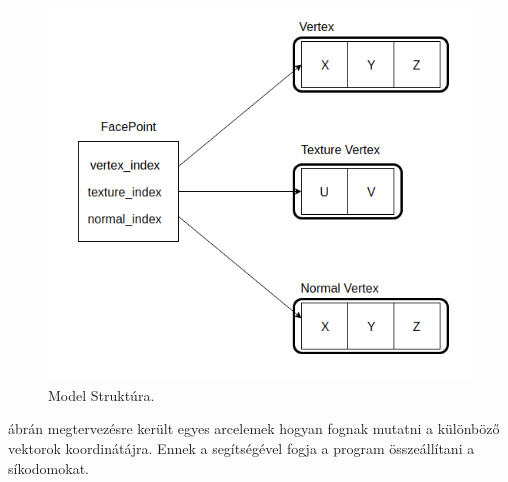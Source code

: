 \bigskip
\begin{figure}[h]
\centering
\includegraphics[scale=0.5]{images/point.png}
\caption{Model Struktúra.}
\label{fig:index_}
\end{figure}
\bigskip

 ábrán megtervezésre került egyes arcelemek hogyan fognak mutatni a különböző vektorok koordinátájra. Ennek a segítségével fogja a program összeállítani a síkodomokat.


